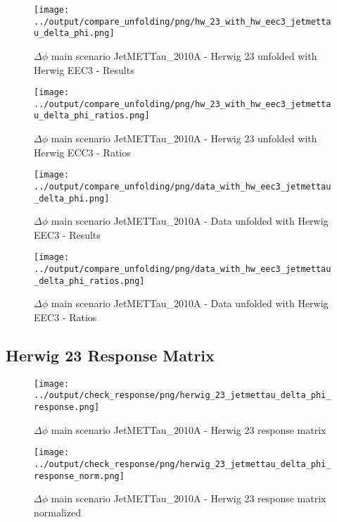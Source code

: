\documentclass[11pt]{book}
\begin{document}
\begin{figure}[ht]
\centering
\texttt{[image: ../output/compare\_unfolding/png/hw\_23\_with\_hw\_eec3\_jetmettau\_delta\_phi.png]}
\caption{$\Delta\phi$ main scenario JetMETTau\_2010A - Herwig 23 unfolded with Herwig EEC3  - Results}
\label{hw_23_hw_eec3_jetmettau_delta_phi_a}
\end{figure}

\begin{figure}[ht]
\centering
\texttt{[image: ../output/compare\_unfolding/png/hw\_23\_with\_hw\_eec3\_jetmettau\_delta\_phi\_ratios.png]}
\caption{$\Delta\phi$ main scenario JetMETTau\_2010A - Herwig 23 unfolded with Herwig ECC3 - Ratios}
\label{hw_23_hw_eec3_jetmettau_delta_phi_b}
\end{figure}

\begin{figure}[ht]
\centering
\texttt{[image: ../output/compare\_unfolding/png/data\_with\_hw\_eec3\_jetmettau\_delta\_phi.png]}
\caption{$\Delta\phi$ main scenario JetMETTau\_2010A - Data unfolded with Herwig EEC3 - Results}
\label{data_hw_eec3_jetmettau_delta_phi_a}
\end{figure}

\begin{figure}[ht]
\centering
\texttt{[image: ../output/compare\_unfolding/png/data\_with\_hw\_eec3\_jetmettau\_delta\_phi\_ratios.png]}
\caption{$\Delta\phi$ main scenario JetMETTau\_2010A - Data unfolded with Herwig EEC3 - Ratios}
\label{data_hw_eec3_jetmettau_delta_phi_b}
\end{figure}



\clearpage
\subsection{Herwig 23 Response Matrix}

\begin{figure}[ht]
\centering
\texttt{[image: ../output/check\_response/png/herwig\_23\_jetmettau\_delta\_phi\_response.png]}
\caption{$\Delta\phi$ main scenario JetMETTau\_2010A - Herwig 23 response matrix}
\label{hw_23_jetmettau_delta_phi_response}
\end{figure}

\begin{figure}[ht]
\centering
\texttt{[image: ../output/check\_response/png/herwig\_23\_jetmettau\_delta\_phi\_response\_norm.png]}
\caption{$\Delta\phi$ main scenario JetMETTau\_2010A - Herwig 23 response matrix normalized}
\label{hw_23_jetmettau_delta_phi_response_norm}
\end{figure}
\end{document}
